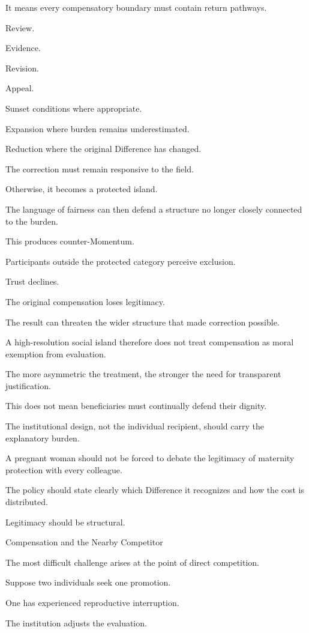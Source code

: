 It means every compensatory boundary must contain return pathways.

Review.

Evidence.

Revision.

Appeal.

Sunset conditions where appropriate.

Expansion where burden remains underestimated.

Reduction where the original Difference has changed.

The correction must remain responsive to the field.

Otherwise, it becomes a protected island.

The language of fairness can then defend a structure no longer closely connected to the burden.

This produces counter-Momentum.

Participants outside the protected category perceive exclusion.

Trust declines.

The original compensation loses legitimacy.

The result can threaten the wider structure that made correction possible.

A high-resolution social island therefore does not treat compensation as moral exemption from evaluation.

The more asymmetric the treatment, the stronger the need for transparent justification.

This does not mean beneficiaries must continually defend their dignity.

The institutional design, not the individual recipient, should carry the explanatory burden.

A pregnant woman should not be forced to debate the legitimacy of maternity protection with every colleague.

The policy should state clearly which Difference it recognizes and how the cost is distributed.

Legitimacy should be structural.

Compensation and the Nearby Competitor

The most difficult challenge arises at the point of direct competition.

Suppose two individuals seek one promotion.

One has experienced reproductive interruption.

The institution adjusts the evaluation.

